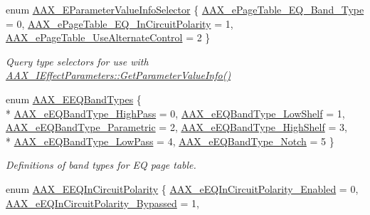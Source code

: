 \begin{DoxyCompactItemize}
enum \hyperlink{a00206_aa169208a2ce713fa021e20deb2eaf608}{A\+A\+X\+\_\+\+E\+Parameter\+Value\+Info\+Selector} \{ \hyperlink{a00206_aa169208a2ce713fa021e20deb2eaf608a99ca84cc3dae0f125082d36893a12bcd}{A\+A\+X\+\_\+e\+Page\+Table\+\_\+\+E\+Q\+\_\+\+Band\+\_\+\+Type} = 0, 
\hyperlink{a00206_aa169208a2ce713fa021e20deb2eaf608ac5a06a293b7706191d3371813c47e999}{A\+A\+X\+\_\+e\+Page\+Table\+\_\+\+E\+Q\+\_\+\+In\+Circuit\+Polarity} = 1, 
\hyperlink{a00206_aa169208a2ce713fa021e20deb2eaf608a1a0d975a333d3aee81b22f878697e9c4}{A\+A\+X\+\_\+e\+Page\+Table\+\_\+\+Use\+Alternate\+Control} = 2
 \}
\begin{DoxyCompactList}\small\item\em Query type selectors for use with \hyperlink{a00061_a1702de6d62b5b41b6a8b2f510300392b}{A\+A\+X\+\_\+\+I\+Effect\+Parameters\+::\+Get\+Parameter\+Value\+Info()} \end{DoxyCompactList}\item 
enum \hyperlink{a00206_a9ec6da28e827496514bd15d6f2b26d95}{A\+A\+X\+\_\+\+E\+E\+Q\+Band\+Types} \{ \\*
\hyperlink{a00206_a9ec6da28e827496514bd15d6f2b26d95a7827eec27ad12a8abb7f466c629b6482}{A\+A\+X\+\_\+e\+E\+Q\+Band\+Type\+\_\+\+High\+Pass} = 0, 
\hyperlink{a00206_a9ec6da28e827496514bd15d6f2b26d95a3dbff637a879e2f187f9ad1bbb97c8a3}{A\+A\+X\+\_\+e\+E\+Q\+Band\+Type\+\_\+\+Low\+Shelf} = 1, 
\hyperlink{a00206_a9ec6da28e827496514bd15d6f2b26d95a162d60d2812f3786ef5f87d288193e95}{A\+A\+X\+\_\+e\+E\+Q\+Band\+Type\+\_\+\+Parametric} = 2, 
\hyperlink{a00206_a9ec6da28e827496514bd15d6f2b26d95aa36c45b5f1a3dd677fdb14020b83d16f}{A\+A\+X\+\_\+e\+E\+Q\+Band\+Type\+\_\+\+High\+Shelf} = 3, 
\\*
\hyperlink{a00206_a9ec6da28e827496514bd15d6f2b26d95a5de1272a9829d9d764a7a25adcdae1eb}{A\+A\+X\+\_\+e\+E\+Q\+Band\+Type\+\_\+\+Low\+Pass} = 4, 
\hyperlink{a00206_a9ec6da28e827496514bd15d6f2b26d95a5e8aee84ee2cd1db292283e7550e64dc}{A\+A\+X\+\_\+e\+E\+Q\+Band\+Type\+\_\+\+Notch} = 5
 \}
\begin{DoxyCompactList}\small\item\em Definitions of band types for E\+Q page table. \end{DoxyCompactList}\item 
enum \hyperlink{a00206_ab5bda96f09874705e9b800d1b1495b48}{A\+A\+X\+\_\+\+E\+E\+Q\+In\+Circuit\+Polarity} \{ \hyperlink{a00206_ab5bda96f09874705e9b800d1b1495b48aa1f21f2aa320ece14a9259195d3ee2bd}{A\+A\+X\+\_\+e\+E\+Q\+In\+Circuit\+Polarity\+\_\+\+Enabled} = 0, 
\hyperlink{a00206_ab5bda96f09874705e9b800d1b1495b48aeef37a6376396f07977b4c233985dfe6}{A\+A\+X\+\_\+e\+E\+Q\+In\+Circuit\+Polarity\+\_\+\+Bypassed} = 1, 

\end{DoxyCompactItemize}
